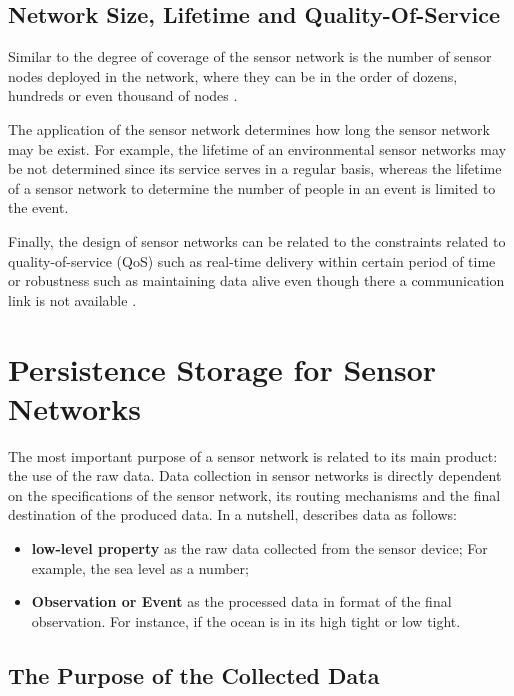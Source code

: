 \subsection{Network Size, Lifetime and Quality-Of-Service}

Similar to the degree of coverage of the sensor network is the number of
sensor nodes deployed in the network, where they can be in the order of
dozens, hundreds or even thousand of nodes \cite{sn-intro01}.

The application of the sensor network determines how long the sensor
network may be exist. For example, the lifetime of an environmental sensor
networks \cite{sn-ex01} may be not determined since its service serves in a
regular basis, whereas the lifetime of a sensor network to determine the number
of people in an event is limited to the event. 

Finally, the design of sensor networks can be related to the constraints
related to quality-of-service (QoS) such as real-time delivery within certain
period of time or robustness such as maintaining data alive even though there
a communication link is not available \cite{sn-intro02}.

\section{Persistence Storage for Sensor Networks}

The most important purpose of a sensor network is related to its main product:
the use of the raw data. Data collection in sensor networks is directly
dependent on the specifications of the sensor network, its routing mechanisms
and the final destination of the produced data. In a nutshell,
\cite{sn-storage03} describes data as follows:

\begin{itemize}
  \item \textbf{low-level property} as the raw data collected from the
  sensor device; For example, the sea level as a number;
  \item \textbf{Observation or Event} as the processed data in format of the final
  observation. For instance, if the ocean is in its high tight or low tight.
\end{itemize}

\subsection{The Purpose of the Collected Data}
\label{sec:sn-data-purpose}


